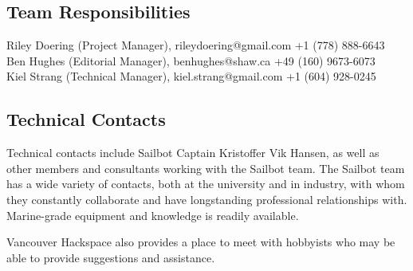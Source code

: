 \subsection{\label{sec:responsibilities:team}Team Responsibilities}
Riley Doering (Project Manager), rileydoering@gmail.com +1 (778) 888-6643\\
Ben Hughes (Editorial Manager), benhughes@shaw.ca +49 (160) 9673-6073\\
Kiel Strang (Technical Manager), kiel.strang@gmail.com +1 (604) 928-0245\\

\subsection{\label{sec:responsibilities:technical-contacts}Technical Contacts}
Technical contacts include Sailbot Captain Kristoffer Vik Hansen, as well as other members and consultants working with the Sailbot team. The Sailbot team has a wide variety of contacts, both at the university and in industry, with whom they constantly collaborate and have longstanding professional relationships with. Marine-grade equipment and knowledge is readily available.

Vancouver Hackspace also provides a place to meet with hobbyists who may be able to provide suggestions and assistance.
